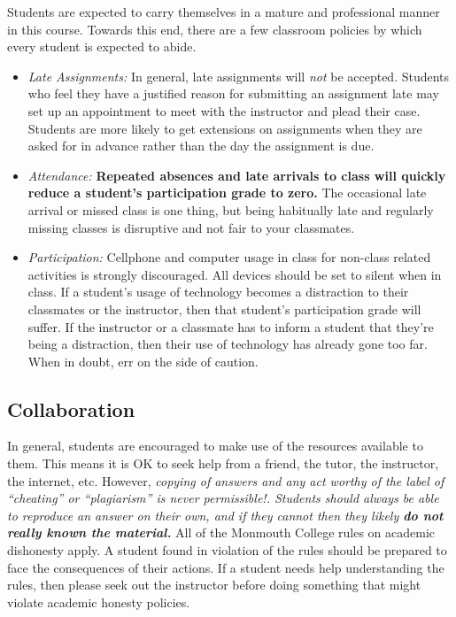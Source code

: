 \documentclass[10pt]{article}
\begin{document}
Students are expected to carry themselves in a mature and professional manner in this course. Towards this end, there are a few classroom policies by which every student is expected to abide.
\begin{itemize}

\item \textit{Late Assignments: } In general, late assignments will \textit{not} be accepted.  Students who feel they have a justified reason for submitting an assignment late may set up an appointment to meet with the instructor and plead their case.  Students are more likely to get extensions on assignments when they are asked for in advance rather than the day the assignment is due.

\item \textit{Attendance: } \textbf{Repeated absences and late arrivals to class will quickly reduce a student's participation grade to zero.}  The occasional late arrival or missed class is one thing, but being habitually late and regularly missing classes is disruptive and not fair to your classmates.

\item \textit{Participation: }  Cellphone and computer usage in class for non-class related activities is strongly discouraged.  All devices should be set to silent when in class.  If a student's usage of technology becomes a distraction to their classmates or the instructor, then that student's participation grade will suffer.  If the instructor or a classmate has to inform a student that they're being a distraction, then their use of technology has already gone too far.  When in doubt, err on the side of caution.

\end{itemize}


\subsection{Collaboration}

In general, students are encouraged to make use of the resources available to them.  This means it is OK to seek help from a friend, the tutor, the instructor, the internet, etc.  However, \textit{copying of answers and any act worthy of the label of ``cheating'' or ``plagiarism'' is never permissible!. Students should always be able to reproduce an answer on their own, and if they cannot then they likely \textbf{do not really known the material.}} All of the Monmouth College rules on academic dishonesty apply.  A student found in violation of the rules should be prepared to face the consequences of their actions. If a student needs help understanding the rules, then please seek out the instructor before doing something that might violate academic honesty policies.
\end{document}
